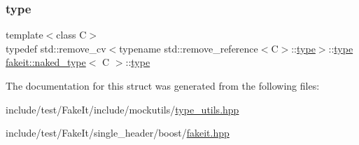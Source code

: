 \subsubsection{\texorpdfstring{type}{type}\hspace{0.1cm}{\footnotesize\ttfamily [9/9]}}
{\footnotesize\ttfamily template$<$class C$>$ \\
typedef std\+::remove\+\_\+cv$<$typename std\+::remove\+\_\+reference$<$C$>$\+::\mbox{\hyperlink{structfakeit_1_1naked__type_a3248a6c417c3a06d6e93576085fe7fcc}{type}}$>$\+::\mbox{\hyperlink{structfakeit_1_1naked__type_a3248a6c417c3a06d6e93576085fe7fcc}{type}} \mbox{\hyperlink{structfakeit_1_1naked__type}{fakeit\+::naked\+\_\+type}}$<$ C $>$\+::\mbox{\hyperlink{structfakeit_1_1naked__type_a3248a6c417c3a06d6e93576085fe7fcc}{type}}}



The documentation for this struct was generated from the following files\+:\begin{DoxyCompactItemize}
\item 
include/test/\+Fake\+It/include/mockutils/\mbox{\hyperlink{type__utils_8hpp}{type\+\_\+utils.\+hpp}}\item 
include/test/\+Fake\+It/single\+\_\+header/boost/\mbox{\hyperlink{single__header_2boost_2fakeit_8hpp}{fakeit.\+hpp}}\end{DoxyCompactItemize}
